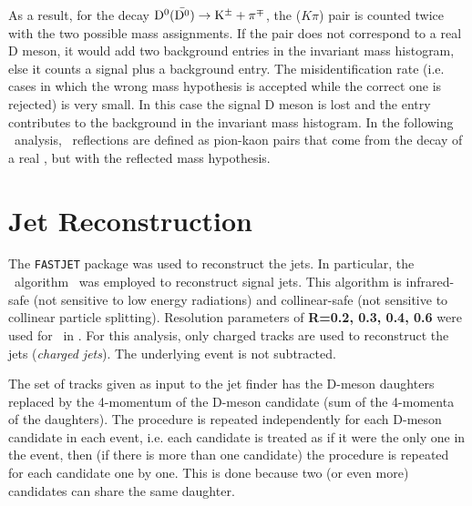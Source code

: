 As a result, for the decay $\mathrm{D^{0}} (\bar{\mathrm{D^{0}}}) \to {\rm K}^{\pm} + \pi^{\mp}$, the ($K\pi$) pair is counted twice with the two possible mass assignments. If the pair does not correspond
to a real D meson, it would add two background entries in the invariant mass histogram, else it 
counts a signal plus a background entry. 
The misidentification rate (i.e. cases in which the wrong mass
hypothesis is accepted while the correct one is rejected) is very small. In this case the signal D meson
is lost and the entry contributes to the background in the invariant mass histogram. In the following \Dzero\ analysis, \Dzero\
reflections are defined as pion-kaon pairs that come from the decay of a real \Dzero, but with the reflected mass hypothesis.



\section{Jet Reconstruction}

The \texttt{FASTJET}\cite{Cacciari:2012} package was used to reconstruct the jets. 
In particular, the \antikt\ algorithm~\cite{Cacciari:2008c} was employed to reconstruct signal jets. 
This algorithm is infrared-safe (not sensitive to low energy radiations) and collinear-safe (not sensitive to collinear particle splitting).
Resolution parameters of {\textbf{R=0.2, 0.3, 0.4, 0.6}} were used for \Dzero\ in \pp.
For this analysis, only charged tracks are used to reconstruct the jets (\emph{charged jets}). The underlying event is not subtracted.

The set of tracks given as input to the jet finder has the D-meson daughters replaced 
by the 4-momentum of the D-meson candidate (sum of the 4-momenta of the daughters).
The procedure is repeated independently for each D-meson candidate in each event, 
i.e. each candidate is treated as if it were the only one in the event, then (if there is more than one candidate) the procedure
is repeated for each candidate one by one.
This is done because two (or even more) candidates can share the same daughter. 


